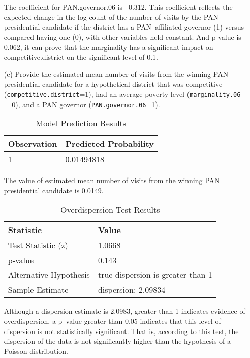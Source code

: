 \documentclass[12pt,letterpaper]{article}
\begin{document}
\begin{enumerate}
	The coefficient for PAN.governor.06 is \texttt{-}0.312. This coefficient reflects the expected change in the log count of the number of visits by the PAN presidential candidate if the district has a PAN\texttt{-}affiliated governor (1) versus compared having one (0), with other variables held constant. And p-value is 0.062, it can prove that the marginality has a significant impact on competitive.district on the significant level of 0.1.
	
	\item [(c)]
	Provide the estimated mean number of visits from the winning PAN presidential candidate for a hypothetical district that was competitive (\texttt{competitive.district}=1), had an average poverty level (\texttt{marginality.06} = 0), and a PAN governor (\texttt{PAN.governor.06}=1).
	\\	
	\begin{table}[htbp]
		\centering
		\caption{Model Prediction Results}
		\begin{tabular}{ll}
			\hline
			\textbf{Observation} & \textbf{Predicted Probability} \\
			\hline 
			1 & 0.01494818 \\
			\hline
		\end{tabular}
		\label{tab:model-prediction}
	\end{table}
	
	The value of estimated mean number of visits from the winning PAN presidential candidate is 0.0149.\\ 
	
	\begin{table}[htbp]
		\centering
		\caption{Overdispersion Test Results}
		\begin{tabular}{ll}
			\hline
			\textbf{Statistic} & \textbf{Value} \\
			\hline
			Test Statistic (z) & 1.0668 \\
			p-value & 0.143 \\
			Alternative Hypothesis & true dispersion is greater than 1 \\
			Sample Estimate & dispersion: 2.09834 \\
			\hline
		\end{tabular}
		\label{tab:overdispersion-test}
	
	\end{table}
	\noindent Although a dispersion estimate is 2.0983, greater than 1 indicates evidence of overdispersion, a p\texttt{-}value greater than 0.05 indicates that this level of dispersion is not statistically significant. That is, according to this test, the dispersion of the data is not significantly higher than the hypothesis of a Poisson distribution.
	
\end{enumerate}
\end{document}
